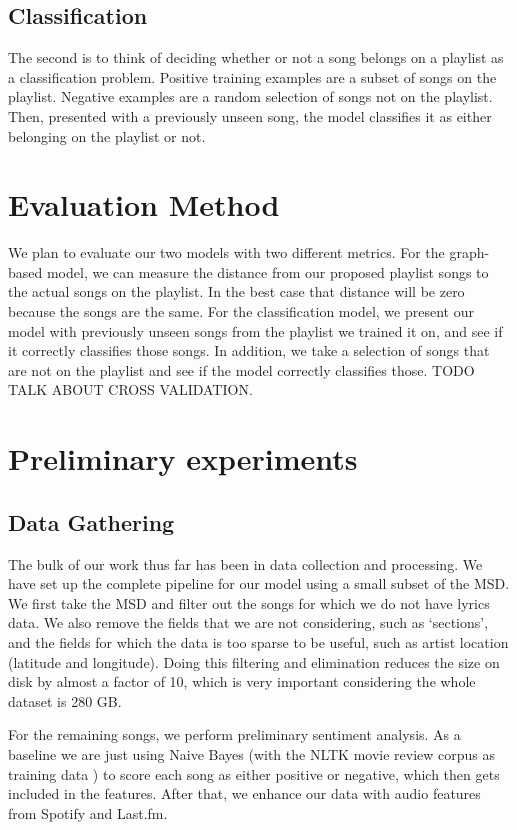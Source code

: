 \documentclass[10pt,journal,compsoc]{IEEEtran}
\begin{document}
\subsection{Classification}
The second is to think of deciding whether or not a song belongs on a playlist as a classification problem. Positive training examples are a subset of songs on the playlist. Negative examples are a random selection of songs not on the playlist. Then, presented with a previously unseen song, the model classifies it as either belonging on the playlist or not.

\section{Evaluation Method}
We plan to evaluate our two models with two different metrics. For the graph-based model, we can measure the distance from our proposed playlist songs to the actual songs on the playlist. In the best case that distance will be zero because the songs are the same. For the classification model, we present our model with previously unseen songs from the playlist we trained it on, and see if it correctly classifies those songs. In addition, we take a selection of songs that are not on the playlist and see if the model correctly classifies those. TODO TALK ABOUT CROSS VALIDATION.

\section{Preliminary experiments}

\subsection{Data Gathering}
The bulk of our work thus far has been in data collection and processing. We have set up the complete pipeline for our model using a small subset of the MSD. We first take the MSD and filter out the songs for which we do not have lyrics data. We also remove the fields that we are not considering, such as `sections', and the fields for which the data is too sparse to be useful, such as artist location (latitude and longitude). Doing this filtering and elimination reduces the size on disk by almost a factor of 10, which is very important considering the whole dataset is 280 GB.

For the remaining songs, we perform preliminary sentiment analysis. As a baseline we are just using Naive Bayes (with the NLTK movie review corpus as training data \cite{nltk}) to score each song as either positive or negative, which then gets included in the features. After that, we enhance our data with audio features from Spotify and Last.fm.
\end{document}
